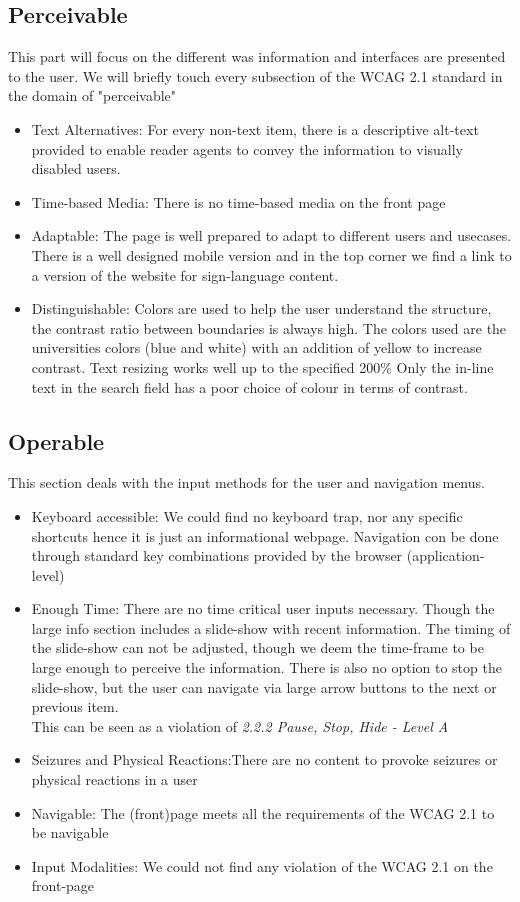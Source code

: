 \subsection*{Perceivable}
This part will focus on the different was information and interfaces are presented to the user. We will briefly touch every subsection of the WCAG 2.1 standard in the domain of "perceivable"
\begin{itemize}
	\item Text Alternatives: For every non-text item, there is a descriptive alt-text provided to enable reader agents to convey the information to visually disabled users.
	\item Time-based Media: There is no time-based media on the front page
	\item Adaptable: The page is well prepared to adapt to different users and usecases. There is a well designed mobile version and in the top corner we find a link to a version of the website for sign-language content.
	\item Distinguishable: Colors are used to help the user understand the structure, the contrast ratio between boundaries is always high. The colors used are the universities colors (blue and white) with an addition of yellow to increase contrast. Text resizing works well up to the specified 200\% 
	Only the in-line text in the search field has a poor choice of colour in terms of contrast.
\end{itemize}

\subsection*{Operable}
This section deals with the input methods for the user and navigation menus.
\begin{itemize}
	\item Keyboard accessible: We could find no keyboard trap, nor any specific shortcuts hence it is just an informational webpage. Navigation con be done through standard key combinations provided by the browser (application-level)
	\item Enough Time: There are no time critical user inputs necessary. Though the large info section includes a slide-show with recent information. The timing of the slide-show can not be adjusted, though we deem the time-frame to be large enough to perceive the information. There is also no option to stop the slide-show, but the user can navigate via large arrow buttons to the next or previous item.\\
	This can be seen as a violation of \textsl{2.2.2 Pause, Stop, Hide - Level A}
	\item Seizures and Physical Reactions:There are no content to provoke seizures or physical reactions in a user
	\item Navigable: The (front)page meets all the requirements of the WCAG 2.1 to be navigable
	\item Input Modalities: We could not find any violation of the WCAG 2.1 on the front-page
\end{itemize}
